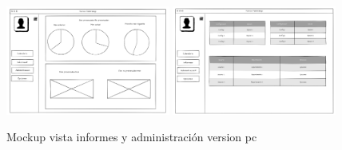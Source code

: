 \documentclass[11pt,spanish,listoffigures,listoftables]{tfgetsinf}
\begin{document}
 \begin{figure}[ht!] %
   \includegraphics[width=0.48\textwidth]{img/Vista_Informes_PC.png}
   \includegraphics[width=0.48\textwidth]{img/Vista_Administracion_PC.png}
   \caption{Mockup vista informes y administración version pc}
   \label{fig:informesPC}
 \end{figure}
\end{document}
